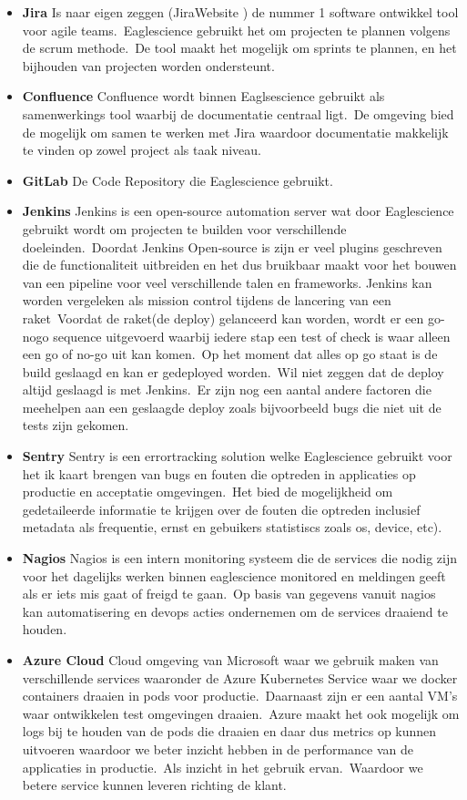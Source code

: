 \begin{itemize}
\item \textbf{Jira} Is naar eigen zeggen (JiraWebsite ) de nummer 1 software ontwikkel tool voor agile teams.\ Eaglescience gebruikt het om projecten te plannen volgens de scrum methode.\ De tool maakt het mogelijk om sprints te plannen, en het bijhouden van projecten worden ondersteunt.
\item \textbf{Confluence}
Confluence wordt binnen Eaglsescience gebruikt als samenwerkings tool waarbij de documentatie centraal ligt.\ De omgeving bied de mogelijk om samen te werken met Jira waardoor documentatie makkelijk te vinden op zowel project als taak niveau.
\item \textbf{GitLab}
De Code Repository die Eaglescience gebruikt.
\item \textbf{Jenkins}
Jenkins is een open-source automation server wat door Eaglescience gebruikt wordt om projecten te builden voor verschillende doeleinden.\ Doordat Jenkins Open-source is zijn er veel plugins geschreven die de functionaliteit uitbreiden en het dus bruikbaar maakt voor het bouwen van een pipeline voor veel verschillende talen en frameworks.
Jenkins kan worden vergeleken als mission control tijdens de lancering van een raket\ Voordat de raket(de deploy) gelanceerd kan worden, wordt er een go-nogo sequence uitgevoerd waarbij iedere stap een test of check is waar alleen een go of no-go uit kan komen.\ Op het moment dat alles op go staat is de build geslaagd en kan er gedeployed worden.\ Wil niet zeggen dat de deploy altijd geslaagd is met Jenkins.\ Er zijn nog een aantal andere factoren die meehelpen aan een geslaagde deploy zoals bijvoorbeeld bugs die niet uit de tests zijn gekomen.
\item \textbf{Sentry}
Sentry is een errortracking solution welke Eaglescience gebruikt voor het ik kaart brengen van bugs en fouten die optreden in applicaties op productie en acceptatie omgevingen.\ Het bied de mogelijkheid om gedetaileerde informatie te krijgen over de fouten die optreden inclusief metadata als frequentie, ernst en gebuikers statistiscs zoals os, device, etc).
\item \textbf{Nagios}
Nagios is een intern monitoring systeem die de services die nodig zijn voor het dagelijks werken binnen eaglescience monitored en meldingen geeft als er iets mis gaat of freigd te gaan.\ Op basis van gegevens vanuit nagios kan automatisering en devops acties ondernemen om de services draaiend te houden.
\item \textbf{Azure Cloud}
Cloud omgeving van Microsoft waar we gebruik maken van verschillende services waaronder de Azure Kubernetes Service waar we docker containers draaien in pods voor productie.\ Daarnaast zijn er een aantal VM's waar ontwikkelen test omgevingen draaien.\ Azure maakt het ook mogelijk om logs bij te houden van de pods die draaien en daar dus metrics op kunnen uitvoeren waardoor we beter inzicht hebben in de performance van de applicaties in productie.\ Als inzicht in het gebruik ervan.\ Waardoor we betere service kunnen leveren richting de klant.
\end{itemize}

